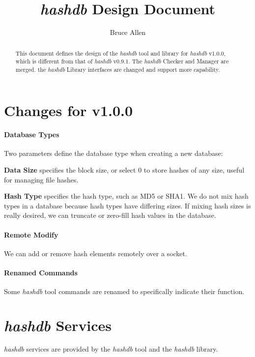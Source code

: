 \documentclass[12pt,twoside]{article}
\newcommand{\hdb}{\emph{hashdb}\xspace}
\begin{document}
\title{\hdb Design Document}
\author{Bruce Allen}
\maketitle

\begin{abstract}
This document defines the design of the \hdb tool and library
for \hdb v1.0.0, which is different from that of \hdb v0.9.1.
The \hdb Checker and Manager are merged.
the \hdb Library interfaces are changed and support more capability.
\end{abstract}

\section{Changes for v1.0.0}
\paragraph{Database Types}
Two parameters define the database type when creating a new database:
\begin{compactitem}
\item \textbf{Data Size} specifies the block size,
or select 0 to store hashes of any size, useful for managing file hashes.
\item \textbf{Hash Type} specifies the hash type, such as MD5 or SHA1.
We do not mix hash types in a database because hash types have differing sizes.
If mixing hash sizes is really desired, we can truncate or zero-fill
hash values in the database.
\end{compactitem}
\paragraph{Remote Modify}
We can add or remove hash elements remotely over a socket.
\paragraph{Renamed Commands}
Some \hdb tool commands are renamed to specifically indicate their function.

\section{\hdb Services}
\hdb services are provided by the \hdb tool and the \hdb library.
\end{document}
